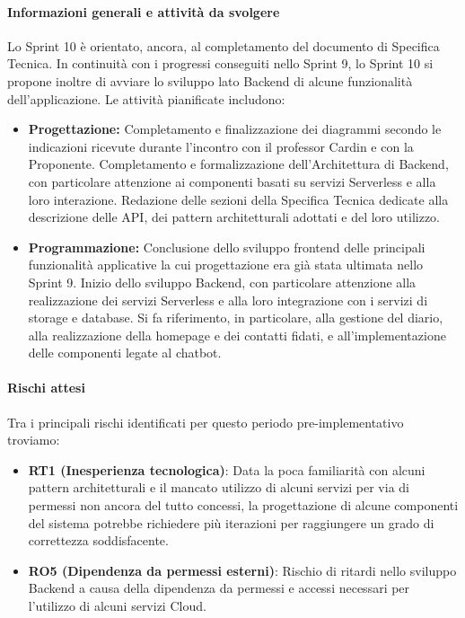 \documentclass[a4paper,12pt]{article}
\begin{document}
\paragraph{Informazioni generali e attività da svolgere}
Lo Sprint 10 è orientato, ancora, al completamento del documento di Specifica Tecnica. In continuità con i progressi conseguiti nello Sprint 9, lo Sprint 10 si propone inoltre di avviare lo sviluppo lato Backend di alcune funzionalità dell’applicazione. Le attività pianificate includono:

\begin{itemize}
\item \textbf{Progettazione:} Completamento e finalizzazione dei diagrammi secondo le indicazioni ricevute durante l'incontro con il professor Cardin e con la Proponente. Completamento e formalizzazione dell’Architettura di Backend, con particolare attenzione ai componenti basati su servizi Serverless e alla loro interazione. Redazione delle sezioni della Specifica Tecnica dedicate alla descrizione delle API, dei pattern architetturali adottati e del loro utilizzo.

\item \textbf{Programmazione:} Conclusione dello sviluppo frontend delle principali funzionalità applicative la cui progettazione era già stata ultimata nello Sprint 9. Inizio dello sviluppo Backend, con particolare attenzione alla realizzazione dei servizi Serverless e alla loro integrazione con i servizi di storage e database. Si fa riferimento, in particolare, alla gestione del diario, alla realizzazione della homepage e dei contatti fidati, e all’implementazione delle componenti legate al chatbot. 
\end{itemize}

\paragraph{Rischi attesi}
Tra i principali rischi identificati per questo periodo pre-implementativo troviamo:
\begin{itemize}
    \item \textbf{RT1 (Inesperienza tecnologica)}: Data la poca familiarità con alcuni pattern architetturali e il mancato utilizzo di alcuni servizi per via di permessi non ancora del tutto concessi, la progettazione di alcune componenti del sistema potrebbe richiedere più iterazioni per raggiungere un grado di correttezza soddisfacente.
    \item \textbf{RO5 (Dipendenza da permessi esterni)}: Rischio di ritardi nello sviluppo Backend a causa della dipendenza da permessi e accessi necessari per l'utilizzo di alcuni servizi Cloud.
\end{itemize}
\end{document}
